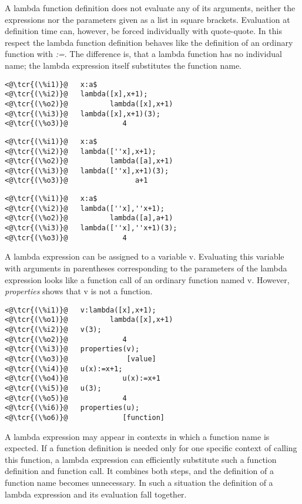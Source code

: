 \documentclass[../Maxima_Workbook.tex]{subfiles}
\begin{document}
\lz A lambda function definition does not evaluate any of its arguments, neither the expressions nor the parameters given as a list in square brackets. Evaluation at definition time can, however, be forced individually with quote-quote. In this respect the lambda function definition behaves like the definition of an ordinary function with \emph{:=}. The difference is, that a lambda function has no individual name; the lambda expression itself substitutes the function name.

\lz \begin{lstlisting}
<@\tcr{(\%i1)}@   x:a$
<@\tcr{(\%i2)}@   lambda([x],x+1);
<@\tcr{(\%o2)}@			 lambda([x],x+1)
<@\tcr{(\%i3)}@   lambda([x],x+1)(3);
<@\tcr{(\%o3)}@				4
\end{lstlisting}

\lz \begin{lstlisting}
<@\tcr{(\%i1)}@   x:a$
<@\tcr{(\%i2)}@   lambda([''x],x+1);
<@\tcr{(\%o2)}@			 lambda([a],x+1)
<@\tcr{(\%i3)}@   lambda([''x],x+1)(3);
<@\tcr{(\%o3)}@			       a+1
\end{lstlisting}

\lz \begin{lstlisting}
<@\tcr{(\%i1)}@   x:a$
<@\tcr{(\%i2)}@   lambda([''x],''x+1);
<@\tcr{(\%o2)}@			 lambda([a],a+1)
<@\tcr{(\%i3)}@   lambda([''x],''x+1)(3);
<@\tcr{(\%o3)}@				4
\end{lstlisting}

\lz A lambda expression can be assigned to a variable v. Evaluating this variable with arguments in parentheses corresponding to the parameters of the lambda expression looks like a function call of an ordinary function named v. However, \emph{properties} shows that v is not a function.

\lz \begin{lstlisting}
<@\tcr{(\%i1)}@   v:lambda([x],x+1);
<@\tcr{(\%o1)}@			 lambda([x],x+1)
<@\tcr{(\%i2)}@   v(3);
<@\tcr{(\%o2)}@				4
<@\tcr{(\%i3)}@   properties(v);
<@\tcr{(\%o3)}@			     [value]
<@\tcr{(\%i4)}@   u(x):=x+1;
<@\tcr{(\%o4)}@			    u(x):=x+1
<@\tcr{(\%i5)}@   u(3);
<@\tcr{(\%o5)}@				4
<@\tcr{(\%i6)}@   properties(u);
<@\tcr{(\%o6)}@			    [function]
\end{lstlisting}

\lz A lambda expression may appear in contexts in which a function name is expected. If a function definition is needed only for one specific context of calling this function, a lambda expression can efficiently substitute such a function definition and function call. It combines both steps, and the definition of a function name becomes unnecessary. In such a situation the definition of a lambda expression and its evaluation fall together. 
\end{document}
